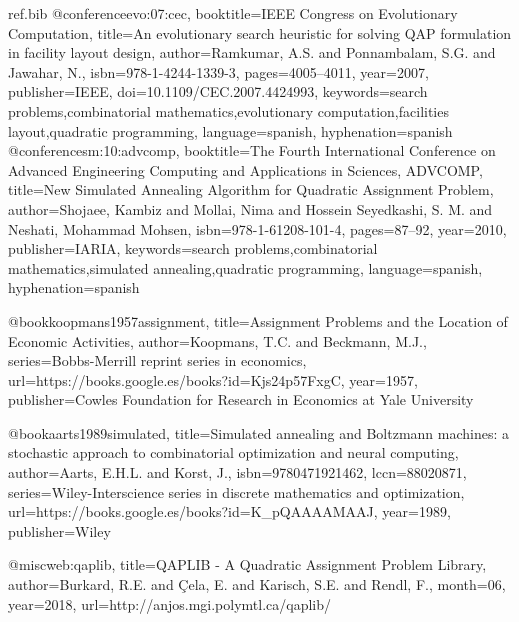 %
% 
% 
% 

\begin{filecontents*}{ref.bib}
@conference{evo:07:cec,
  booktitle={IEEE Congress on Evolutionary Computation},
  title={An evolutionary search heuristic for solving QAP formulation in facility layout design},
  author={Ramkumar, A.S. and Ponnambalam, S.G. and Jawahar, N.},
  isbn={978-1-4244-1339-3},
  pages={4005--4011},
  year={2007},
  publisher={IEEE},
  doi={10.1109/CEC.2007.4424993},
  keywords={search problems,combinatorial mathematics,evolutionary computation,facilities layout,quadratic programming},
  language={spanish},
  hyphenation={spanish}
}
@conference{sm:10:advcomp,
  booktitle={The Fourth International Conference on Advanced Engineering Computing and Applications in Sciences, ADVCOMP},
  title={New Simulated Annealing Algorithm for Quadratic Assignment Problem},
  author={Shojaee, Kambiz and Mollai, Nima and Hossein Seyedkashi, S. M. and Neshati, Mohammad Mohsen},
  isbn={978-1-61208-101-4},
  pages={87--92},
  year={2010},
  publisher={IARIA},
  keywords={search problems,combinatorial mathematics,simulated annealing,quadratic programming},
  language={spanish},
  hyphenation={spanish}
}

@book{koopmans1957assignment,
  title={Assignment Problems and the Location of Economic Activities},
  author={Koopmans, T.C. and Beckmann, M.J.},
  series={Bobbs-Merrill reprint series in economics},
  url={https://books.google.es/books?id=Kjs24p57FxgC},
  year={1957},
  publisher={Cowles Foundation for Research in Economics at Yale University}
}

@book{aarts1989simulated,
  title={Simulated annealing and Boltzmann machines: a stochastic approach to combinatorial optimization and neural computing},
  author={Aarts, E.H.L. and Korst, J.},
  isbn={9780471921462},
  lccn={88020871},
  series={Wiley-Interscience series in discrete mathematics and optimization},
  url={https://books.google.es/books?id=K\_pQAAAAMAAJ},
  year={1989},
  publisher={Wiley}
}

@misc{web:qaplib,
  title={QAPLIB - A Quadratic Assignment Problem Library},
  author={Burkard, R.E. and Çela, E. and Karisch, S.E. and Rendl, F.},
  month={06},
  year={2018},
  url={http://anjos.mgi.polymtl.ca/qaplib/}
}
\end{filecontents*}

